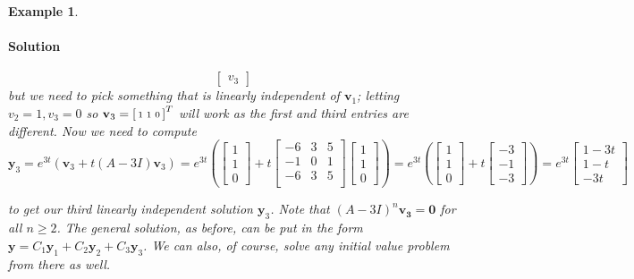 \documentclass[letterpaper, 11pt, openany]{book}
\theoremstyle{mytheoremstyle}
\theoremstyle{myexamplestyle}
\newtheorem{example}{Example}[section]
\newenvironment{solution}{\paragraph{\sffamily \smaller \fontseries{b}\selectfont Solution}}{\hfill\faSquare}
\begin{document}
\begin{example}
\begin{enumerate}
\begin{solution}
\[\begin{bmatrix}
                v_3
            \end{bmatrix}\]
            but we need to pick something that is linearly independent of \(\mathbf{v}_1\); letting \(v_2 = 1, v_3 = 0\) so \(\mathbf{v}_3 = \begin{bsmallmatrix}1& 1& 0\end{bsmallmatrix}^{T}\) will work as the first and third entries are different. Now we need to compute
            \[\mathbf{y}_3 = e^{3t}\left(\mathbf{v}_3 + t(A - 3I)\mathbf{v}_3\right) = e^{3t}\left(\begin{bmatrix}
                1 \\ 1 \\ 0
            \end{bmatrix} + t \left[
                        \begin{array}{ccc}
                        -6 & 3 & 5 \\
                        -1 & 0 & 1 \\
                        -6 & 3 & 5 \\
                        \end{array}
                        \right] \begin{bmatrix}
                1 \\ 1 \\ 0
            \end{bmatrix}\right) = e^{3t}\left(\begin{bmatrix}
                1 \\ 1 \\ 0
            \end{bmatrix} +  t\begin{bmatrix}
                -3 \\ -1 \\ -3
            \end{bmatrix}\right) 
            = e^{3t} \begin{bmatrix}1 - 3t\\ 1-t \\ -3t\end{bmatrix}\]

            to get our third linearly independent solution \(\mathbf{y}_3\). Note that \((A-3I)^n \mathbf{v_{3}} = \mathbf{0}\) for all \(n \geq 2\). The general solution, as before, can be put in the form \(\mathbf{y} = C_1 \mathbf{y}_1 + C_2 \mathbf{y}_2 + C_3 \mathbf{y}_3\). We can also, of course, solve any initial value problem from there as well.
        \end{solution}


\end{enumerate}
\end{example}
\end{document}
